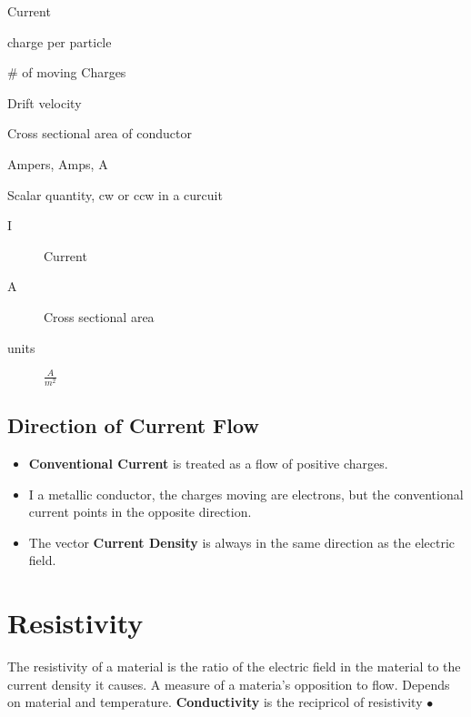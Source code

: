 
\begin{description}
	\item[I] Current
	\item[q] charge per particle
	\item[n] \# of moving Charges
	\item[$v_{d}$] Drift velocity
	\item[A] Cross sectional area of conductor
	\item[units] Ampers, Amps, A
	\item Scalar quantity, cw or ccw in a curcuit
\end{description}

\begin{description}
	\item[I] Current
	\item[A] Cross sectional area
	\item[units] $\frac{A}{m^2}$
\end{description}

\subsection{Direction of Current Flow}%
\label{sub:direction_of_current_flow}

\begin{itemize}
	\item \textbf{Conventional Current} is treated as a flow of positive charges.
	\item I a metallic conductor, the charges moving are electrons, but the
		conventional current points in the opposite direction.
	\item The vector \textbf{Current Density} is always in the same direction
		as the electric field.
\end{itemize}

\section{Resistivity}%
\label{sec:resistivity}

\begin{definition}[Resistivity]
	The resistivity of a material is the ratio of the electric field in the material to the
	current density it causes. A measure of a materia's opposition to flow. Depends on
	material and temperature. \textbf{Conductivity} is the recipricol of resistivity
\smallskip\hfill$\bullet$\end{definition}

